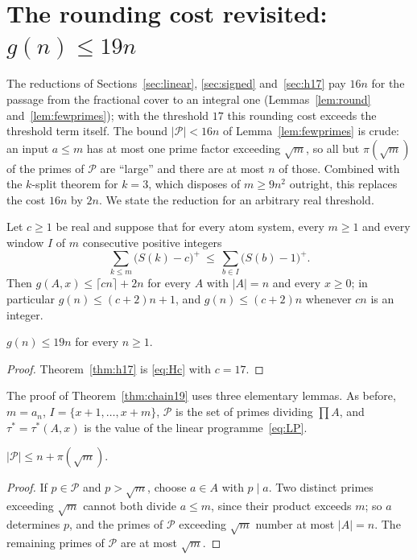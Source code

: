 \section{The rounding cost revisited: $g(n)\le19n$}\label{sec:chain19}

The reductions of Sections~\ref{sec:linear}, \ref{sec:signed} and~\ref{sec:h17} pay $16n$ for the passage from the
fractional cover to an integral one (Lemmas~\ref{lem:round} and~\ref{lem:fewprimes}); with the threshold $17$ this
rounding cost exceeds the threshold term itself. The bound $|\mathcal P|<16n$ of Lemma~\ref{lem:fewprimes} is crude:
an input $a\le m$ has at most one prime factor exceeding $\sqrt m$, so all but $\pi(\sqrt m)$ of the primes of
$\mathcal P$ are ``large'' and there are at most $n$ of those. Combined with the $k$-split theorem for $k=3$, which
disposes of $m\ge9n^2$ outright, this replaces the cost $16n$ by $2n$. We state the reduction for an arbitrary
real threshold.

\begin{theorem}\label{thm:chain19}
Let $c\ge1$ be real and suppose that for every atom system, every $m\ge1$ and every window $I$ of $m$ consecutive
positive integers
\begin{equation}\label{eq:Hc}
\sum_{k\le m}\bigl(S(k)-c\bigr)^+\ \le\ \sum_{b\in I}\bigl(S(b)-1\bigr)^+ .
\end{equation}
Then $g(A,x)\le\lceil cn\rceil+2n$ for every $A$ with $|A|=n$ and every $x\ge0$; in particular $g(n)\le(c+2)n+1$,
and $g(n)\le(c+2)n$ whenever $cn$ is an integer.
\end{theorem}

\begin{corollary}\label{cor:19n}
$g(n)\le19n$ for every $n\ge1$.
\end{corollary}
\begin{proof}
Theorem~\ref{thm:h17} is \eqref{eq:Hc} with $c=17$.
\end{proof}

The proof of Theorem~\ref{thm:chain19} uses three elementary lemmas. As before, $m=a_n$, $I=\{x+1,\dots,x+m\}$,
$\mathcal P$ is the set of primes dividing $\prod A$, and $\tau^*=\tau^*(A,x)$ is the value of the linear
programme~\eqref{eq:LP}.

\begin{lemma}\label{lem:primecount}
$|\mathcal P|\le n+\pi(\sqrt m)$.
\end{lemma}
\begin{proof}
If $p\in\mathcal P$ and $p>\sqrt m$, choose $a\in A$ with $p\mid a$. Two distinct primes exceeding $\sqrt m$ cannot
both divide $a\le m$, since their product exceeds $m$; so $a$ determines $p$, and the primes of $\mathcal P$ exceeding
$\sqrt m$ number at most $|A|=n$. The remaining primes of $\mathcal P$ are at most $\sqrt m$.
\end{proof}

